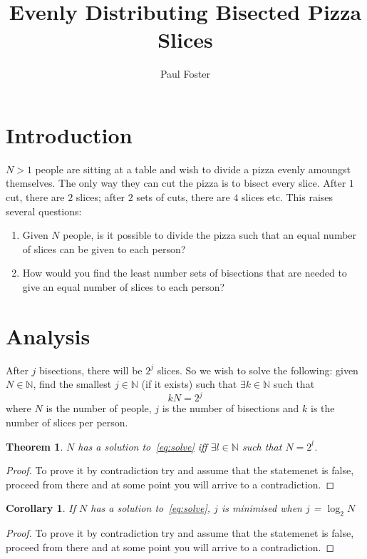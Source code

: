 \documentclass{article}
\title{Evenly Distributing Bisected Pizza Slices}
\author{Paul Foster}
\begin{document}
\maketitle

\newtheorem{theorem}{Theorem}
\newtheorem{corollary}{Corollary}[theorem]
\newtheorem{lemma}[theorem]{Lemma}

\section{Introduction}
$N>1$ people are sitting at a table and wish to divide a pizza evenly amoungst themselves. The only way they can cut the pizza is to bisect every slice. After $1$ cut, there are $2$ slices; after $2$ sets of cuts, there are $4$ slices etc. This raises several questions:
\begin{enumerate}
  \item Given $N$ people, is it possible to divide the pizza such that an equal number of slices can be given to each person?
  \item How would you find the least number sets of bisections that are needed to give an equal number of slices to each person?
\end{enumerate}

\section{Analysis}
After $j$ bisections, there will be $2^j$ slices. So we wish to solve the following: given $N \in \mathbb{N}$, find the smallest $j \in \mathbb{N}$ (if it exists) such that $\exists k \in \mathbb{N}$ such that
\begin{equation} \label{eq:solve}
  kN = 2^j
\end{equation}
where $N$ is the number of people, $j$ is the number of bisections and $k$ is the number of slices per person.

\begin{theorem}
$N$ has a solution to~\eqref{eq:solve} iff $\exists l \in \mathbb{N}$ such that $N = 2^l$.
\end{theorem}

\begin{proof}
To prove it by contradiction try and assume that the statemenet is false,
proceed from there and at some point you will arrive to a contradiction.
\end{proof}


\begin{corollary}
If $N$ has a solution to~\eqref{eq:solve}, $j$ is minimised when $j$ = $\log_2 N$
\end{corollary}

\begin{proof}
To prove it by contradiction try and assume that the statemenet is false,
proceed from there and at some point you will arrive to a contradiction.
\end{proof}
\end{document}
